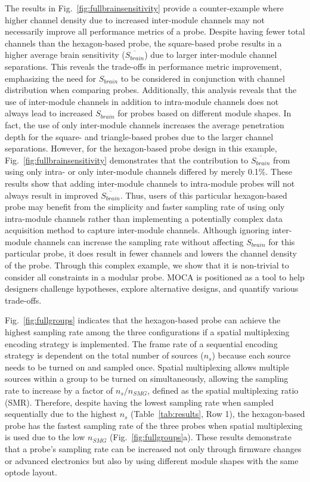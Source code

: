 The results in Fig.~\ref{fig:fullbrainsensitivity} provide a counter-example where higher channel density due to increased inter-module channels may not necessarily improve all performance metrics of a probe. Despite having fewer total channels than the hexagon-based probe, the square-based probe results in a higher average brain sensitivity ($\overline{S_{brain}}$) due to larger inter-module channel separations. This reveals the trade-offs in performance metric improvement, emphasizing the need for $S_{brain}$ to be considered in conjunction with channel distribution when comparing probes. Additionally, this analysis reveals that the use of inter-module channels in addition to intra-module channels does not always lead to increased $S_{brain}$ for probes based on different module shapes. In fact, the use of only inter-module channels increases the average penetration depth for the square- and triangle-based probes due to the larger channel separations. However, for the hexagon-based probe design in this example, Fig.~\ref{fig:fullbrainsensitivity} demonstrates that the contribution to $\overline{S_{brain}}$ from using only intra- or only inter-module channels differed by merely 0.1\%. These results show that adding inter-module channels to intra-module probes will not always result in improved $\overline{S_{brain}}$. Thus, users of this particular hexagon-based probe may benefit from the simplicity and faster sampling rate of using only intra-module channels rather than implementing a potentially complex data acquisition method to capture inter-module channels. Although ignoring inter-module channels can increase the sampling rate without affecting $S_{brain}$ for this particular probe, it does result in fewer channels and lowers the channel density of the probe. Through this complex example, we show that it is non-trivial to consider all constraints in a modular probe. MOCA is positioned as a tool to help designers challenge hypotheses, explore alternative designs, and quantify various trade-offs.

Fig.~\ref{fig:fullgroups} indicates that the hexagon-based probe can achieve the highest sampling rate among the three configurations if a spatial multiplexing encoding strategy is implemented. The frame rate of a sequential encoding strategy is dependent on the total number of sources ($n_s$) because each source needs to be turned on and sampled once. Spatial multiplexing allows multiple sources within a group to be turned on simultaneously, allowing the sampling rate to increase by a factor of $n_s/n_{SMG}$, defined as the spatial multiplexing ratio (SMR). Therefore, despite having the lowest sampling rate when sampled sequentially due to the highest $n_s$ (Table~\ref{tab:results}, Row 1), the hexagon-based probe has the fastest sampling rate of the three probes when spatial multiplexing is used due to the low $n_{SMG}$ (Fig.~\ref{fig:fullgroups}a). These results demonstrate that a probe's sampling rate can be increased not only through firmware changes or advanced electronics but also by using different module shapes with the same optode layout.


